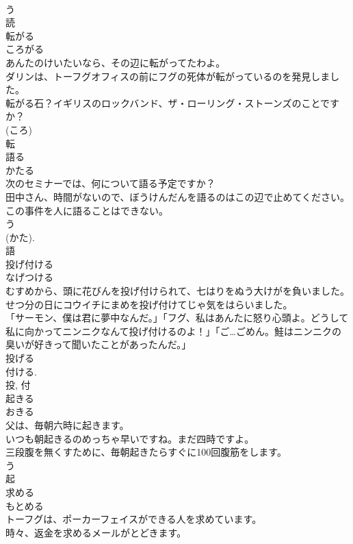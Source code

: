\documentclass[8pt]{extreport}
\begin{document}
\begin{CJK}{UTF8}{min}
\\	う 
\\	読	
\\	転がる	
\\	ころがる	
\\	あんたのけいたいなら、その辺に転がってたわよ。	
\\	ダリンは、トーフグオフィスの前にフグの死体が転がっているのを発見しました。	
\\	転がる石？イギリスのロックバンド、ザ・ローリング・ストーンズのことですか？	
\\	(ころ) 
\\	転	
\\	語る	
\\	かたる	
\\	次のセミナーでは、何について語る予定ですか？	
\\	田中さん、時間がないので、ぼうけんだんを語るのはこの辺で止めてください。	
\\	この事件を人に語ることはできない。	
\\	う 
\\	(かた). 
\\	語	
\\	投げ付ける	
\\	なげつける	
\\	むすめから、頭に花びんを投げ付けられて、七はりをぬう大けがを負いました。	
\\	せつ分の日にコウイチにまめを投げ付けてじゃ気をはらいました。	
\\	「サーモン、僕は君に夢中なんだ。」「フグ、私はあんたに怒り心頭よ。どうして私に向かってニンニクなんて投げ付けるのよ！」「ご…ごめん。鮭はニンニクの臭いが好きって聞いたことがあったんだ。」	
\\	投げる 
\\	付ける. 
\\	投, 付	
\\	起きる	
\\	おきる	
\\	父は、毎朝六時に起きます。	
\\	いつも朝起きるのめっちゃ早いですね。まだ四時ですよ。	
\\	三段腹を無くすために、毎朝起きたらすぐに100回腹筋をします。	
\\	う 
\\	起	
\\	求める	
\\	もとめる	
\\	トーフグは、ポーカーフェイスができる人を求めています。	
\\	時々、返金を求めるメールがとどきます。	

\end{CJK}
\end{document}

